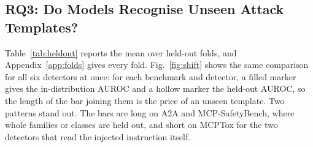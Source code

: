 \documentclass[conference,compsoc]{IEEEtran}
\begin{document}
\begin{table}[!t]
\centering
\caption{RQ2, architecture ablation: test macro-F1 / AUROC (chunk scoring throughout). Rows 1--6: earlier study, seeds 0--1 (full model 0--2). Last row: the flat read-out re-run in the five-seed study with the selection half of validation. Params: trainable parameters. $L_{f}$: residual-aware Lipschitz bound~(\ref{eq:lip-residual}) of the seed-0 A2A model.}
\label{tab:abl}
\footnotesize
\renewcommand{\arraystretch}{1.12}
\setlength{\tabcolsep}{1.8pt}
\end{table}

\subsection{RQ3: Do Models Recognise Unseen Attack Templates?}
\label{sec:res-heldout}
Table~\ref{tab:heldout} reports the mean over held-out folds, and Appendix~\ref{app:folds} gives every fold. Fig.~\ref{fig:shift} shows the same comparison for all six detectors at once: for each benchmark and detector, a filled marker gives the in-distribution AUROC and a hollow marker the held-out AUROC, so the length of the bar joining them is the price of an unseen template. Two patterns stand out. The bars are long on A2A and MCP-SafetyBench, where whole families or classes are held out, and short on MCPTox for the two detectors that read the injected instruction itself.
\end{document}
